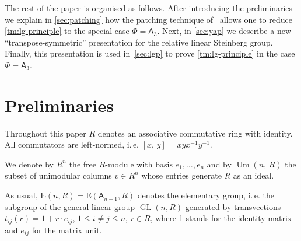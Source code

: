 \documentclass[11pt]{amsart}
\theoremstyle{plain} \declaretheorem[name=Theorem, Refname={Theorem,Theorems}]{tm} \Crefname{tm}{Theorem}{Theorems}
\numberwithin{equation}{section}
\theoremstyle{definition} \newtheorem{df}[lm]{Definition} \Crefname{df}{Definition}{Definitions}
\theoremstyle{remark} \newtheorem{rk}[lm]{Remark} \Crefname{rk}{Remark}{Remarks}
\newcommand{\E}{{\mathrm{E}}}
\newcommand{\Um}{\mathop{\mathrm{Um}}\nolimits}
\newcommand{\St}{\mathop{\mathrm{St}}\nolimits}
\newcommand{\GL}{\mathop{\mathrm{GL}}\nolimits}
\newcommand{\SL}{\mathop{\mathrm{SL}}\nolimits}
\newcommand{\inv}{^{-1}}
\newcommand{\rA}{\mathsf{A}}
\begin{document}
The rest of the paper is organised as follows. 
After introducing the preliminaries we explain in \cref{sec:patching} how the patching technique of~\cite{SCh} allows one to reduce \cref{tm:lg-principle} to the special case $\Phi=\rA_3$.
Next, in \cref{sec:yap} we describe a new ``transpose-symmetric'' presentation for the relative linear Steinberg group.
Finally, this presentation is used in~\cref{sec:lgp} to prove \cref{tm:lg-principle} in the case $\Phi=\rA_3$.

\section{Preliminaries} \label{sec:prelim}
Throughout this paper $R$ denotes an associative commutative ring with identity.
All commutators are left-normed, i.\,e. $[x,\,y]=xyx\inv y\inv$. 




We denote by $R^n$ the free $R$-module with basis $e_1,\ldots,e_n$ and by $\Um(n,\,R)$ the subset of unimodular columns $v\in R^n$ 
whose entries generate $R$ as an ideal.

As usual, $\E(n, R)=\E(\rA_{n-1}, R)$ denotes the elementary group, i.\,e. the subgroup of the general linear group $\GL(n, R)$ generated by transvections
$t_{ij}(r)=1+r \cdot e_{ij}$, $1\leq i\neq j\leq n$, $r\in R$,
where 1 stands for the identity matrix and $e_{ij}$ for the matrix unit.
\end{document}
